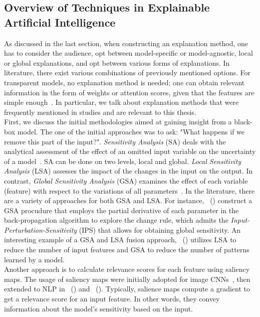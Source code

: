 \subsection{Overview of Techniques in Explainable Artificial Intelligence}
\label{subsec:explainableArtificialIntelligence_Overview}
As discussed in the last section, when constructing an explanation method, one has to consider the audience,
opt between model-specific or model-agnostic, local or global explanations, and opt between various forms of explanations. In literature, there exist various combinations of previously mentioned options. For transparent models, no explanation method is needed; one can obtain relevant information in the form of weights or attention scores, given that the features are simple enough~\parencite{XAIConceptsTaxonomies_Arrieta}. In particular, we talk about explanation methods that were frequently mentioned in studies and are relevant to this thesis.\\
First, we discuss the initial methodologies aimed at gaining insight from a black-box model. The one of the initial approaches was to ask: "What happens if we remove this part of the input?". \emph{Sensitivity Analysis} (SA) deals with the analytical assessment of the effect of an omitted input variable on the uncertainty of a model~\parencite{SensitivityAndGeneralizationInNNs_Novak}. SA can be done on two levels, local and global. \emph{Local Sensitivity Analysis} (LSA) assesses the impact of the changes in the input on the output. In contrast, \emph{Global Sensitivity Analysis} (GSA) examines the effect of each variable (feature) with respect to the variations of all parameters~\parencite{InputPerturbationSensitivity_Rao}. In the literature, there are a variety of approaches for both GSA and LSA. For instance,~\citeauthor{SensitivityAndGeneralizationInNNs_Novak} (\citeyear{SensitivityAndGeneralizationInNNs_Novak}) construct a GSA procudure that employs the partial derivative of each parameter in the back-propagation algorithm to explore the change rule, which admits the \emph{Input-Perturbation-Sensitivity} (IPS) that allows for obtaining global sensitivity. An interesting example of a GSA and LSA fusion approach,~\citeauthor{SensitivityAnalysisForPNNs_Kowalski} (\citeyear{SensitivityAnalysisForPNNs_Kowalski}) utilizes LSA to reduce the number of input features and GSA to reduce the number of patterns learned by a model.\\
Another approach is to calculate relevance scores for each feature using saliency maps. The usage of saliency maps were initially adopted for image CNNs~\parencite{DeepInsideCNNs_Simonyan}, then extended to NLP in~\citeauthor{ExtractionOfSalientSentences_Denil} (\citeyear{ExtractionOfSalientSentences_Denil}) and~\citeauthor{AskTheGRU_Trapit} (\citeyear{AskTheGRU_Trapit}). Typically, salience maps compute a gradient to get a relevance score for an input feature. In other words, they convey information about the model's sensitivity based on the input.\\
